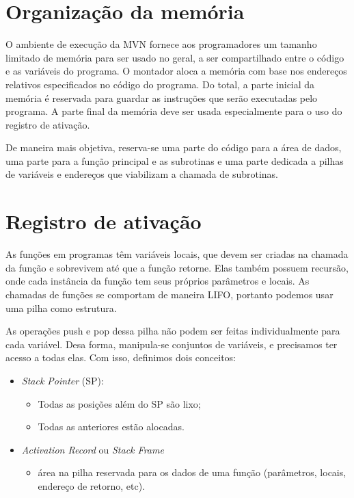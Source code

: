 
\section{Organização da memória}

O ambiente de execução da MVN fornece aos programadores um tamanho limitado de memória para ser usado no geral, a ser compartilhado entre o código e as variáveis do programa. O montador aloca a memória com base nos endereços relativos especificados no código do programa. Do total, a parte inicial da memória é reservada para guardar as instruções que serão executadas pelo programa. A parte final da memória deve ser usada especialmente para o uso do registro de ativação.

De maneira mais objetiva, reserva-se uma parte do código para a área de dados, uma parte para a função principal e as subrotinas e uma parte dedicada a pilhas de variáveis e endereços que viabilizam a chamada de subrotinas.

\section{Registro de ativação}

As funções em programas têm variáveis locais, que devem ser criadas na chamada da função e sobrevivem até que a função retorne. Elas também possuem recursão, onde cada instância da função tem seus próprios parâmetros e locais. As chamadas de funções se comportam de maneira LIFO, portanto podemos usar uma pilha como estrutura.

As operações push e pop dessa pilha não podem ser feitas individualmente para cada variável. Desa forma, manipula-se conjuntos de variáveis, e precisamos ter acesso a todas elas. Com isso, definimos dois conceitos:

\begin{itemize}
	\item \emph{Stack Pointer} (SP):
	\begin{itemize}
		\item Todas as posições além do SP são lixo;
		\item Todas as anteriores estão alocadas.
	\end{itemize}
	
	\item \emph{Activation Record} ou \emph{Stack Frame}
	\begin{itemize}
		\item área na pilha reservada para os dados de uma função (parâmetros, locais, endereço de retorno, etc).
	\end{itemize}
\end{itemize}

